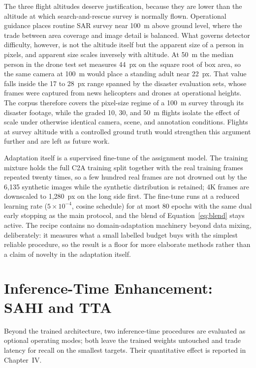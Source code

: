 The three flight altitudes deserve justification, because they are lower than
the altitude at which search-and-rescue survey is normally flown. Operational
guidance places routine SAR survey near 100~m above ground level, where the
trade between area coverage and image detail is balanced. What governs detector
difficulty, however, is not the altitude itself but the apparent size of a
person in pixels, and apparent size scales inversely with altitude. At 50~m the
median person in the drone test set measures 44~px on the square root of box
area, so the same camera at 100~m would place a standing adult near 22~px. That
value falls inside the 17 to 28~px range spanned by the disaster evaluation
sets, whose frames were captured from news helicopters and drones at
operational heights. The corpus therefore covers the pixel-size regime of a
100~m survey through its disaster footage, while the graded 10, 30, and 50~m
flights isolate the effect of scale under otherwise identical camera, scene,
and annotation conditions. Flights at survey altitude with a controlled ground
truth would strengthen this argument further and are left as future work.

Adaptation itself is a supervised fine-tune of the assignment model. The
training mixture holds the full C2A training split together with the real
training frames repeated twenty times, so a few hundred real frames are not
drowned out by the 6{,}135 synthetic images while the synthetic distribution
is retained; 4K frames are downscaled to 1{,}280~px on the long side first.
The fine-tune runs at a reduced learning rate ($5\times10^{-4}$, cosine
schedule) for at most 80 epochs with the same dual early stopping as the main
protocol, and the blend of Equation~\eqref{eq:blend} stays active. The recipe
contains no domain-adaptation machinery beyond data mixing, deliberately: it
measures what a small labelled budget buys with the simplest reliable
procedure, so the result is a floor for more elaborate methods rather than a
claim of novelty in the adaptation itself.

\section{Inference-Time Enhancement: SAHI and TTA}
Beyond the trained architecture, two inference-time procedures are evaluated as
optional operating modes; both leave the trained weights untouched and trade
latency for recall on the smallest targets. Their quantitative effect is
reported in Chapter~IV.

